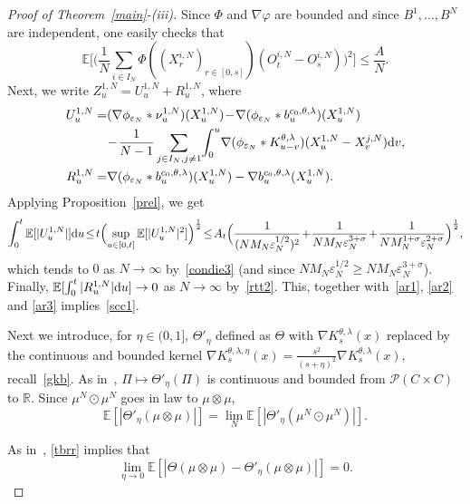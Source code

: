 \documentclass[11pt]{article}
\newcommand{\E}{\mathbb{E}}
\newcommand{\R}{\mathbb{R}}
\newcommand{\1}{\mathbbm{1}}
\newcommand{\dd}{{\rm d}}
\newcommand{\Pp}{\mathcal P}
\newcommand{\e}{\varepsilon}
\newcommand{\vip}{\vskip5pt}
\begin{document}
\begin{proof}[Proof of Theorem~\ref{main}-(iii)]
Since $\Phi$ and $\nabla \varphi$ are bounded and since $B^1,\dots,B^N$ are independent, 
one easily checks that
\begin{equation}\label{ar2}
\E\Big[ \Big(\frac 1{N}\sum_{i\in I_{N}}
\Phi((X^{i,N}_r)_{r\in [0,s]})(O^{i,N}_t-O^{i,N}_s)\Big)^2 \Big] \leq \frac{A}N.
\end{equation}
Next, we write $Z^{1,N}_u=U^{1,N}_u+R^{1,N}_u$, where
\begin{align*}
U^{1,N}_u=&(\nabla \phi_{\e_N}\ast \nu^{1,N}_u)(X^{1,N}_u)\!-\! \nabla (\phi_{\e_N}\ast b^{c_0,\theta,\lambda}_u)(X^{1,N}_u)\\
&\!-\!\frac1{N-1}\sum_{j\in I_{N},j\neq 1}\!\int_0^u\! \nabla (\phi_{\e_N}\ast K^{\theta,\lambda}_{u-v})(X^{1,N}_u-X^{j,N}_v) \dd v,\\
R^{1,N}_u=&\nabla (\phi_{\e_N}\ast b^{c_0,\theta,\lambda}_u)(X^{1,N}_u)-\nabla b^{c_0,\theta,\lambda}_u(X^{1,N}_u).
\end{align*}
Applying Proposition~\ref{prel}, we get
\begin{align}\label{ar3}
\int_0^t\E[|U^{1,N}_u|]\dd u \!\leq\! t \Big(\!\sup_{u\in [0,t]}\E[|U^{1,N}_u|^2]\Big)^{\frac12}
\!\leq\! A_t \Big(\frac{1}{(NM_N\e_N^{1/2})^2}\!+\!\frac{1}{NM_N\e_N^{3+\sigma}}\!+\!\frac{1}{NM_N^{1+\sigma}\e_N^{2+\sigma}}
\Big)^{\frac12},
\end{align}
which tends to $0$ as $N\to \infty$ by~\eqref{condie3} (and since $NM_N\e_N^{1/2}\geq NM_N\e_N^{3+\sigma}$).
Finally, $\E[\int_0^t |R^{1,N}_u| \dd u] \to 0$ as $N\to \infty$ by~\eqref{rtt2}. This, together with~\eqref{ar1}, \eqref{ar2} and \eqref{ar3} implies~\eqref{scc1}.

\vip

Next we introduce, for $\eta\in (0,1]$, 
$\Theta'_\eta$ defined as $\Theta$ with $\nabla K^{\theta,\lambda}_s(x)$ replaced by the continuous and 
bounded kernel $\nabla K^{\theta,\lambda,\eta}_s(x)=
\frac{s^2}{(s+\eta)^2}\nabla K^{\theta,\lambda}_s(x)$, recall~\eqref{gkb}. 
As in~\cite[proof of Theorem~14, Step~2.2]{FT1},
$\Pi \mapsto \Theta'_\eta(\Pi)$ is continuous and bounded from $\Pp(C\times C)$ to $\R$. 
Since $\mu^N\odot\mu^N$ goes in law to $\mu \otimes \mu$,
\begin{equation}\label{scc2}
\E[|\Theta'_\eta(\mu\otimes \mu)|]=\lim_{N} \E[|\Theta'_\eta(\mu^N\odot\mu^N)|].
\end{equation}

As in~\cite[proof of Theorem~14, Step~2.3]{FT1}, \eqref{tbrr} implies that
\begin{equation}\label{pld}
\lim_{\eta\to 0} \E[|\Theta(\mu\otimes \mu)-\Theta'_\eta(\mu\otimes \mu)|]=0.
\end{equation}


\end{proof}
\end{document}
